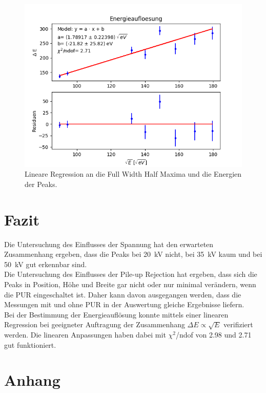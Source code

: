 \documentclass[12pt,a4paper]{article}
\begin{document}
\begin{figure}
\centering
\includegraphics[scale=0.8]{Bilder/Energieaufloesung/roentgen_gesamt.png}
\caption{Lineare Regression an die Full Width Half Maxima und die Energien der Peaks.}
\label{fig:roentgen_energieaufloesung}
\end{figure}

\section{Fazit}
Die Untersuchung des Einflusses der Spannung hat den erwarteten Zusammenhang ergeben, dass die Peaks bei \SI{20}{kV} nicht, bei \SI{35}{kV} kaum und bei \SI{50}{kV} gut erkennbar sind. \\
Die Untersuchung des Einflusses der Pile-up Rejection hat ergeben, dass sich die Peaks in Position, Höhe und Breite gar nicht oder nur minimal verändern, wenn die PUR eingeschaltet ist. Daher kann davon ausgegangen werden, dass die Messungen mit und ohne PUR in der Auswertung gleiche Ergebnisse liefern. \\
Bei der Bestimmung der Energieauflösung konnte mittels einer linearen Regression bei geeigneter Auftragung der Zusammenhang $\Delta E \propto \sqrt{E}$ verifiziert werden. Die linearen Anpassungen haben dabei mit $\chi ^2$/ndof von 2.98 und 2.71 gut funktioniert.


\newpage 
\section{Anhang}
\end{document}
